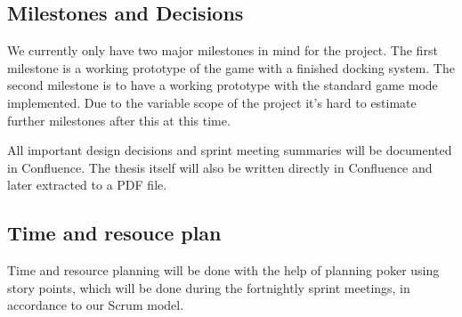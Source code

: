 \subsection*{Milestones and Decisions}
We currently only have two major milestones in mind for the project. The first milestone is a working prototype of the game with a finished docking system. The second milestone is to have a working prototype with the standard game mode implemented. Due to the variable scope of the project it’s hard to estimate further milestones after this at this time.

All important design decisions and sprint meeting summaries will be documented in Confluence. The thesis itself will also be written directly in Confluence and later extracted to a PDF file. 

\subsection*{Time and resouce plan}
Time and resource planning will be done with the help of planning poker using story points, which will be done during the fortnightly sprint meetings, in accordance to our Scrum model. 